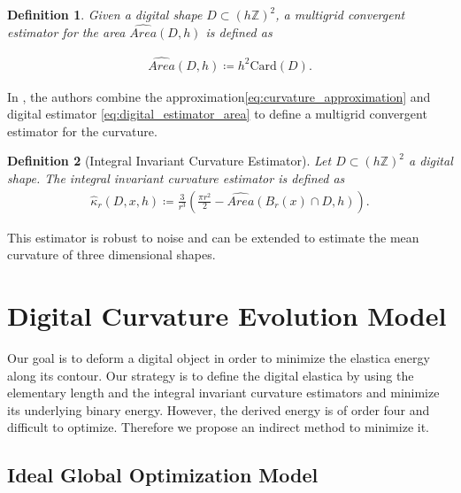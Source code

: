 \documentclass[runningheads]{llncs}
\newtheorem{ddef}{Definition}
\begin{document}
\begin{ddef}	
  Given a digital shape $D \subset (h \mathbb{Z})^2$, a multigrid convergent estimator for the area $\widehat{Area}(D,h)$ is defined as	
		
  \begin{align}
    \widehat{Area}(D,h) \coloneqq h^2\text{Card}\left( D \right).	
    \label{eq:digital_estimator_area}
  \end{align}
\end{ddef}
	
In \cite{coeurjolly13}, the authors combine the approximation\eqref{eq:curvature_approximation} and digital estimator
\eqref{eq:digital_estimator_area} to define a multigrid convergent estimator for the curvature.

\begin{ddef}[Integral Invariant Curvature Estimator]
  Let $D \subset (h \mathbb{Z})^2$ a digital shape. The integral invariant curvature estimator is defined as
  \begin{align*}
    \hat{\kappa}_{r}(D,x,h) \coloneqq \frac{3}{r^3} \left( \frac{\pi r^2}{2} - \widehat{Area} \left( B_{r} ( x ) \cap D, h \right) \right).
  \end{align*}
\end{ddef}


This estimator is robust to noise and can be extended to estimate the mean curvature of three dimensional shapes.


\section{Digital Curvature Evolution Model}


Our goal is to deform a digital object in order to minimize the elastica energy along its contour. Our strategy is to
define the digital elastica by using the elementary length and the integral invariant curvature estimators and minimize
its underlying binary energy. However, the derived energy is of order four and difficult to optimize. Therefore we
propose an indirect method to minimize it. %


\subsection{Ideal Global Optimization Model}
\end{document}
